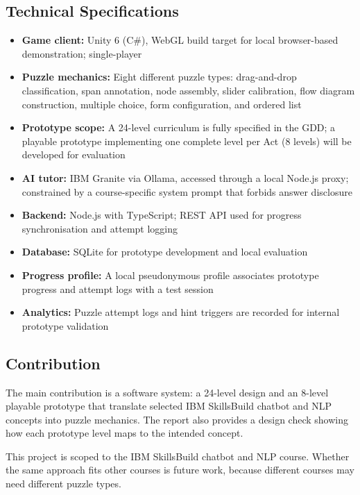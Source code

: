 \documentclass[11pt,a4paper]{article}
\begin{document}
\subsection{Technical Specifications}

\begin{itemize}[leftmargin=1.5em, itemsep=2pt]
  \item \textbf{Game client:} Unity 6 (C\#), WebGL build target for local browser-based demonstration; single-player
  \item \textbf{Puzzle mechanics:} Eight different puzzle types: drag-and-drop classification, span annotation, node assembly, slider calibration, flow diagram construction, multiple choice, form configuration, and ordered list
  \item \textbf{Prototype scope:} A 24-level curriculum is fully specified in the GDD; a playable prototype implementing one complete level per Act (8 levels) will be developed for evaluation
  \item \textbf{AI tutor:} IBM Granite via Ollama, accessed through a local Node.js proxy; constrained by a course-specific system prompt that forbids answer disclosure
  \item \textbf{Backend:} Node.js with TypeScript; REST API used for progress synchronisation and attempt logging
  \item \textbf{Database:} SQLite for prototype development and local evaluation
  \item \textbf{Progress profile:} A local pseudonymous profile associates prototype progress and attempt logs with a test session
  \item \textbf{Analytics:} Puzzle attempt logs and hint triggers are recorded for internal prototype validation
\end{itemize}

\subsection{Contribution}

The main contribution is a software system: a 24-level design and an 8-level playable prototype that translate selected IBM SkillsBuild chatbot and NLP concepts into puzzle mechanics. The report also provides a design check showing how each prototype level maps to the intended concept.

This project is scoped to the IBM SkillsBuild chatbot and NLP course. Whether the same approach fits other courses is future work, because different courses may need different puzzle types.
\end{document}
